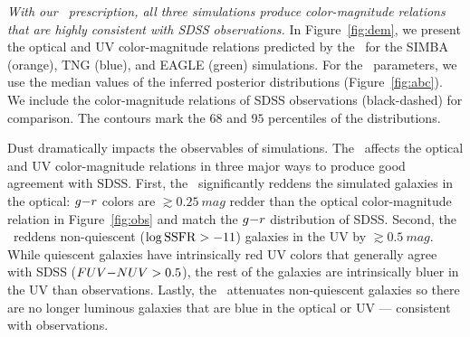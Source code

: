 \emph{With our \eda~prescription, all three simulations produce
color-magnitude relations that are highly consistent with SDSS observations.}
In Figure~\ref{fig:dem}, we present the optical and UV color-magnitude
relations predicted by the 
\eda~for the SIMBA (orange), TNG (blue), and EAGLE (green) simulations. 
For the \eda~parameters, we use the median values of the inferred posterior distributions (Figure~\ref{fig:abc}). 
We include the color-magnitude
relations of SDSS observations (black-dashed) for comparison. 
The contours mark the $68$ and $95$ percentiles of the distributions. 

Dust dramatically impacts the observables of simulations. 
The \eda~affects the optical and UV color-magnitude relations in three
major ways to produce good agreement with SDSS. 
First, the \eda~significantly reddens the simulated galaxies in the optical: 
$g{-}r$ colors are ${\gtrsim}0.25~mag$ redder than the optical
color-magnitude relation in Figure~\ref{fig:obs} and match the $g{-}r$
distribution of SDSS. 
Second, the \eda~reddens non-quiescent ($\log{\rm SSFR} > -11$) galaxies in the UV
by ${\gtrsim}0.5~mag$. 
While quiescent galaxies have intrinsically red UV colors that generally agree
with SDSS ($FUV{-}NUV > 0.5$), the rest of the galaxies are intrinsically
bluer in the UV than observations. 
Lastly, the \eda~attenuates non-quiescent galaxies so there are no longer
luminous galaxies that are blue in the optical or UV --- consistent with observations.

